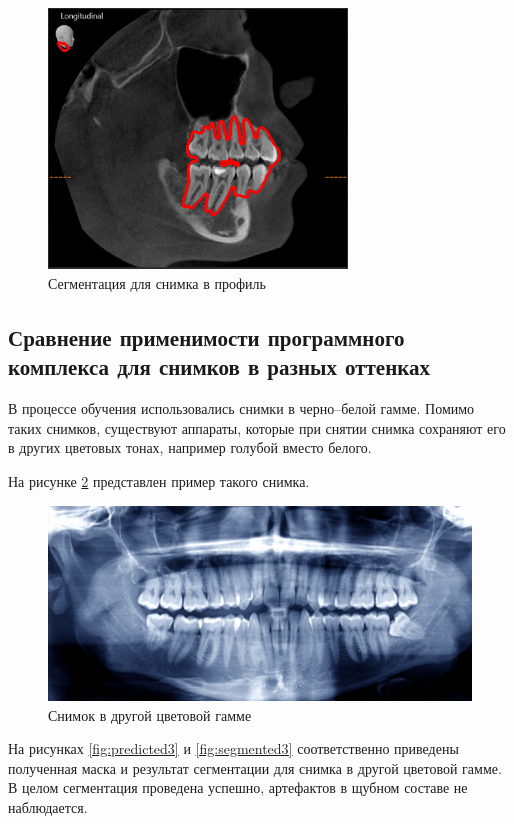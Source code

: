 \begin{figure}[H]
	\centering
	\includegraphics[width=300px]{img/segmented2.png}
	\caption{Сегментация для снимка в профиль}
	\label{fig:segmented2}
\end{figure}

\subsection{Сравнение применимости программного комплекса для снимков в разных оттенках}

В процессе обучения использовались снимки в черно--белой гамме. Помимо таких снимков, существуют аппараты, которые при снятии снимка сохраняют его в других цветовых тонах, например голубой вместо белого.

На рисунке \ref{fig:blue} представлен пример такого снимка.

\begin{figure}[H]
	\centering
	\includegraphics[width=\textwidth]{img/blue.jpeg}
	\caption{Снимок в другой цветовой гамме}
	\label{fig:blue}
\end{figure}

На рисунках \ref{fig:predicted3} и \ref{fig:segmented3} соответственно приведены полученная маска и результат сегментации для снимка в другой цветовой гамме. В целом сегментация проведена успешно, артефактов в щубном составе не наблюдается.

